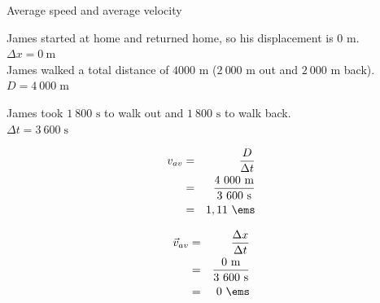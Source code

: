 \begin{wex}{Average speed and average velocity}
{
James started at home and returned home, so his displacement is 0 m.\\
$\Delta x = 0\ \text{m}$\\
James walked a total distance of $4 000 \text{ m}$ ($2\ 000\text{ m}$ out and $2\ 000\text{ m}$ back).\\
$D = 4\ 000\;\text{m}$

James took $1~800\text{ s}$ to walk out and $1~800\text{ s}$ to walk back.\\
$\Delta t = 3\ 600\;\text{s}$

\begin{eqnarray*}
v_{av}&=&\frac{D}{\Delta t}\\
&=&\frac{4\ 000\ \text{m}}{3\ 600\ \text{s}}\\
&=&1,11\ \ems
\end{eqnarray*}

\begin{eqnarray*}
{\vec{v}_{av}}&=&\frac{\Delta x}{\Delta t}\\
&=&\frac{0\ \text{m}}{3\ 600\ \text{s}}\\
&=& 0\ \ems
\end{eqnarray*}}
\end{wex}
    \noindent
      \label{m38791*uid37}
